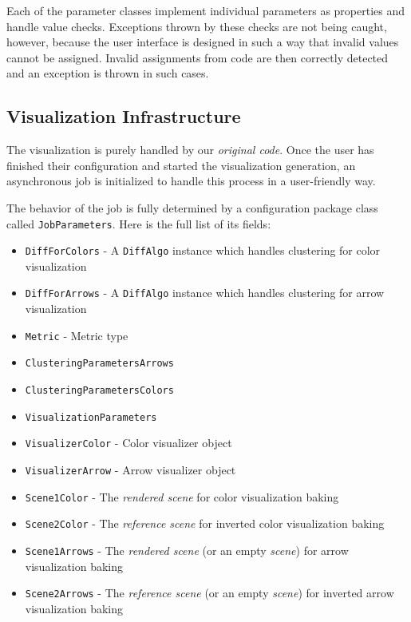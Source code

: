 Each of the parameter classes implement individual parameters as properties and handle value checks. Exceptions thrown by these checks are not being caught, however, because the user interface is designed in such a way that invalid values cannot be assigned. Invalid assignments from code are then correctly detected and an exception is thrown in such cases.
\subsection{Visualization Infrastructure}
\label{subsec:implementation-architecture-infrastructure}

The visualization is purely handled by our {\it original code}. Once the user has finished their configuration and started the visualization generation, an asynchronous job is initialized to handle this process in a user-friendly way.

The behavior of the job is fully determined by a configuration package class called \verb+JobParameters+. Here is the full list of its fields:

\begin{itemize}
\item \verb+DiffForColors+ - A \verb+DiffAlgo+ instance which handles clustering for color visualization
\item \verb+DiffForArrows+ - A \verb+DiffAlgo+ instance which handles clustering for arrow visualization
\item \verb+Metric+ - Metric type
\item \verb+ClusteringParametersArrows+
\item \verb+ClusteringParametersColors+
\item \verb+VisualizationParameters+
\item \verb+VisualizerColor+ - Color visualizer object
\item \verb+VisualizerArrow+ - Arrow visualizer object
\item \verb+Scene1Color+ - The {\it rendered scene} for color visualization baking
\item \verb+Scene2Color+ - The {\it reference scene} for inverted color visualization baking
\item \verb+Scene1Arrows+ - The {\it rendered scene} (or an empty {\it scene}) for arrow visualization baking
\item \verb+Scene2Arrows+ - The {\it reference scene} (or an empty {\it scene}) for inverted arrow visualization baking
\end{itemize}

